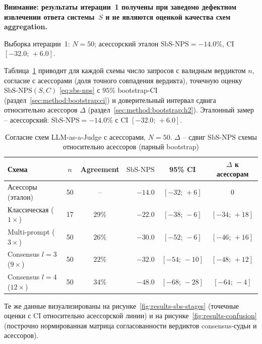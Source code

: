 \begin{center}
\textbf{Внимание: результаты итерации~1 получены при заведомо дефектном
извлечении ответа системы~$S$ и не являются оценкой качества схем
aggregation.}
\end{center}
Выборка итерации~1: $N = 50$; асессорский эталон
$\mathrm{SbS\text{-}NPS} = -14.0\%$, CI $[-32.0;\,+6.0]$.

Таблица~\ref{tab:results-agreement} приводит для каждой схемы число
запросов с валидным вердиктом $n$, согласие с асессорами (доля точного
совпадения вердикта), точечную оценку $\mathrm{SbS\text{-}NPS}(S, C)$
\eqref{eq:sbs-nps} с $95\%$ bootstrap-CI
(раздел~\ref{sec:method:bootstrap:ci}) и доверительный интервал сдвига
относительно асессоров $\Delta$ (раздел~\ref{sec:method:bootstrap:h2}).
Эталонный замер -- асессорский: $\mathrm{SbS\text{-}NPS} = -14.0\%$ с CI
$[-32.0;\,+6.0]$.

\begin{table}[htbp]
    \centering
    \caption{Согласие схем LLM-as-a-Judge с асессорами, $N = 50$.
        $\Delta$ -- сдвиг $\mathrm{SbS\text{-}NPS}$ схемы относительно
        асессоров (парный bootstrap)}
    \label{tab:results-agreement}
    \begin{tabular}{lccrcc}
        \toprule
        Схема & $n$ & Agreement &
            \multicolumn{1}{c}{$\mathrm{SbS\text{-}NPS}$} &
            95\% CI & $\Delta$ к асессорам \\
        \midrule
        Асессоры (эталон) & 50 & -- & $-14.0$ & $[-32;\,{+}6]$ & $0$ \\
        Классическая ($1\times$) & 17 & $29\%$ & $-22.0$ &
            $[-38;\,{-}6]$ & $[-34;\,{+}18]$ \\
        Multi-prompt ($3\times$) & 50 & $26\%$ & $-30.0$ &
            $[-52;\,{-}6]$ & $[-46;\,{+}16]$ \\
        Consensus $l{=}3$ ($9\times$) & 50 & $22\%$ & $-32.0$ &
            $[-54;\,{-}10]$ & $[-48;\,{+}12]$ \\
        Consensus $l{=}4$ ($12\times$) & 50 & $34\%$ & $-48.0$ &
            $[-68;\,{-}28]$ & $[-64;\,{-}4]$ \\
        \bottomrule
    \end{tabular}
\end{table}

Те же данные визуализированы на рисунке~\ref{fig:results-sbs-stages}
(точечные оценки с CI относительно асессорской линии) и на
рисунке~\ref{fig:results-confusion} (построчно нормированная матрица
согласованности вердиктов consensus-судьи и асессоров).

